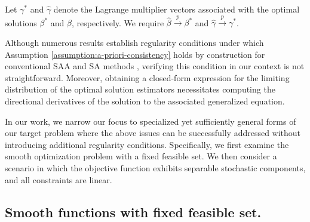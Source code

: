 \begin{assumption} \label{assumption:a-priori-consistency}
    Let $\gamma^*$ and $\widehat{\gamma}$ denote the Lagrange multiplier vectors associated with the optimal solutions $\beta^*$ and $\widehat{\beta}$, respectively. We require $\widehat{\beta} \xrightarrow{p} \beta^*$ and $\widehat{\gamma} \xrightarrow{p} \gamma^*$.
\end{assumption}

Although numerous results establish regularity conditions under which Assumption \ref{assumption:a-priori-consistency} holds by construction for conventional SAA and SA methods \citep[e.g.,][]{dupacova1988asymptotic,shapiro2000statistical}, verifying this condition in our context is not straightforward. Moreover, obtaining a closed-form expression for the limiting distribution of the optimal solution estimators necessitates computing the directional derivatives of the solution to the associated generalized equation.

In our work, we narrow our focus to specialized yet sufficiently general forms of our target problem where the above issues can be successfully addressed without introducing additional regularity conditions. Specifically, we first examine the smooth optimization problem with a fixed feasible set. We then consider a scenario in which the objective function exhibits separable stochastic components, and all constraints are linear.


\subsection{Smooth functions with fixed feasible set.}


